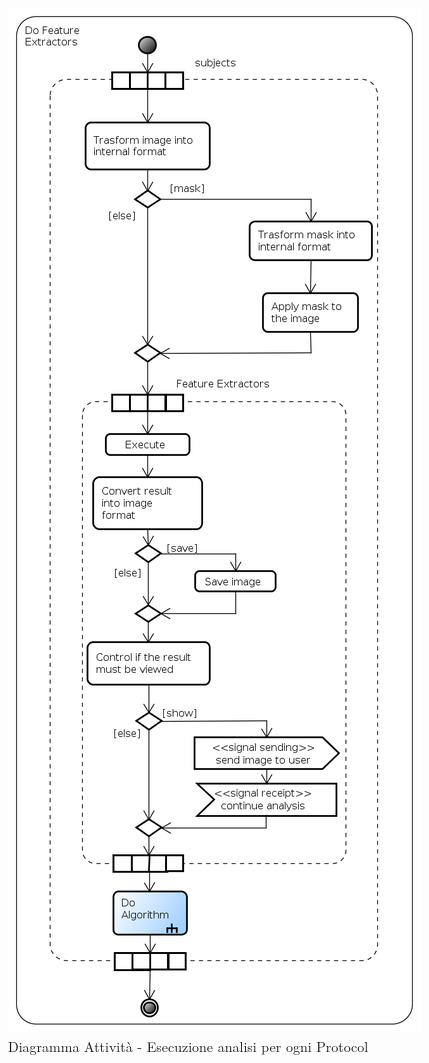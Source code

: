 \begin{figure}[!h]
\centering
\includegraphics[width=0.65\linewidth]{./Content/Immagini/Do}
\caption{Diagramma Attività - Esecuzione analisi per ogni Protocol}
\label{DoA}
\end{figure}
\pagebreak

